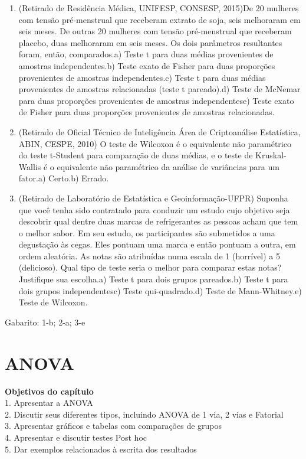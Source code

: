 \documentclass[
]{book}
\begin{document}
\begin{enumerate}
\def\labelenumi{\arabic{enumi}.}
\item
  (Retirado de Residência Médica, UNIFESP, CONSESP, 2015)De 20 mulheres com tensão pré-menstrual que receberam extrato de soja, seis melhoraram em seis meses. De outras 20 mulheres com tensão pré-menstrual que receberam placebo, duas melhoraram em seis meses. Os dois parâmetros resultantes foram, então, comparados.a) Teste t para duas médias provenientes de amostras independentes.b) Teste exato de Fisher para duas proporções provenientes de amostras independentes.c) Teste t para duas médias provenientes de amostras relacionadas (teste t pareado).d) Teste de McNemar para duas proporções provenientes de amostras independentese) Teste exato de Fisher para duas proporções provenientes de amostras relacionadas.
\item
  (Retirado de Oficial Técnico de Inteligência Área de Criptoanálise Estatística, ABIN, CESPE, 2010) O teste de Wilcoxon é o equivalente não paramétrico do teste t-Student para comparação de duas médias, e o teste de Kruskal-Wallis é o equivalente não paramétrico da análise de variâncias para um fator.a) Certo.b) Errado.
\item
  (Retirado de Laboratório de Estatística e Geoinformação-UFPR) Suponha que você tenha sido contratado para conduzir um estudo cujo objetivo seja descobrir qual dentre duas marcas de refrigerantes as pessoas acham que tem o melhor sabor. Em seu estudo, os participantes são submetidos a uma degustação às cegas. Eles pontuam uma marca e então pontuam a outra, em ordem aleatória. As notas são atribuídas numa escala de 1 (horrível) a 5 (delicioso). Qual tipo de teste seria o melhor para comparar estas notas? Justifique sua escolha.a) Teste t para dois grupos pareados.b) Teste t para dois grupos independentesc) Teste qui-quadrado.d) Teste de Mann-Whitney.e) Teste de Wilcoxon.
\end{enumerate}

Gabarito: 1-b; 2-a; 3-e

\hypertarget{anova}{%
\chapter{ANOVA}\label{anova}}

\textbf{Objetivos do capítulo}\\
1. Apresentar a ANOVA\\
2. Discutir seus diferentes tipos, incluindo ANOVA de 1 via, 2 vias e Fatorial\\
3. Apresentar gráficos e tabelas com comparações de grupos\\
4. Apresentar e discutir testes Post hoc\\
5. Dar exemplos relacionados à escrita dos resultados
\end{document}
